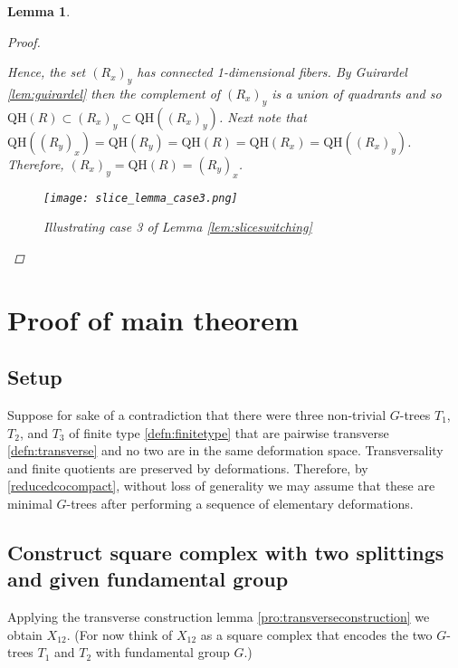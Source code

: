 \documentclass[12pt,parskip=full]{report}
\theoremstyle{plain}
\newtheorem{lem}[thm]{Lemma}
\theoremstyle{definition}
\newcommand{\rxy}{(R_x)_y}
\newcommand{\ryx}{(R_y)_x}
\begin{document}
\begin{lem}
\begin{proof}
\begin{enumerate}
        \end{enumerate}
        Hence, the set $\rxy$ has connected 1-dimensional fibers. By Guirardel \ref{lem:guirardel} then the complement of $\rxy$ is a union of quadrants and so $\text{QH}(R)\subset \rxy\subset \text{QH}(\rxy)$. Next note that $\text{QH}((R_y)_x)=\text{QH}(R_y)=\text{QH}(R)=\text{QH}(R_x)=\text{QH}((R_x)_y)$. Therefore, $\rxy =\text{QH}(R)=\ryx$.
        
        
        
        \begin{figure}[htp]
    \centering
    \texttt{[image: slice\_lemma\_case3.png]}
    \caption{Illustrating case 3 of Lemma \ref{lem:sliceswitching}}
    \label{fig:square}
\end{figure}
        
        
        
                  
    \end{proof}
\end{lem}

\chapter{Proof of main theorem}

\section{Setup}

Suppose for sake of a contradiction that there were three non-trivial \(G\)-trees \(T_{1}\), \(T_{2}\), and \(T_{3}\) of finite type \ref{defn:finitetype} that are pairwise transverse \ref{defn:transverse} and no two are in the same deformation space. Transversality and finite quotients are preserved by deformations. Therefore, by \ref{reducedcocompact}, without loss of generality we may assume that these are minimal \(G\)-trees after performing a sequence of elementary deformations. 

\section{Construct square complex with two splittings and given fundamental group}

Applying the transverse construction lemma \ref{pro:transverseconstruction} we obtain \(X_{12}\). (For now think of $X_{12}$ as a square complex that encodes the two $G$-trees $T_1$ and $T_2$ with fundamental group $G$.) 
\end{document}

